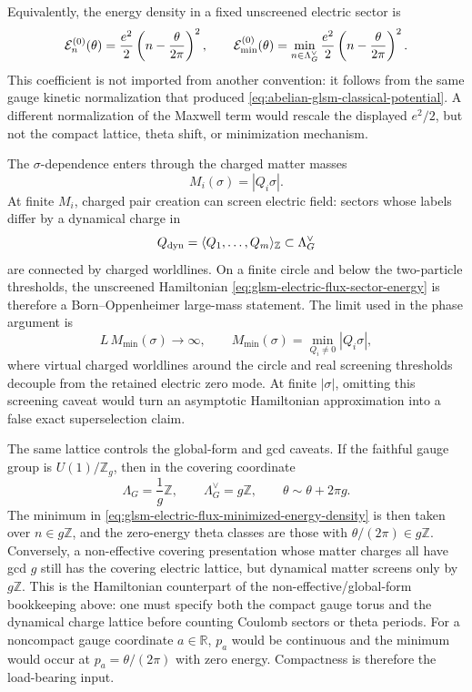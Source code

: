 Equivalently, the energy density in a fixed unscreened electric sector is
\begin{equation}
  \mathcal E^{(0)}_n(\theta)
  =
  \frac{e^2}{2}
  \left(n-\frac{\theta}{2\pi}\right)^2,
  \qquad
  \mathcal E^{(0)}_{\rm min}(\theta)
  =
  \min_{n\in\Lambda_G^\vee}
  \frac{e^2}{2}
  \left(n-\frac{\theta}{2\pi}\right)^2 .
  \label{eq:glsm-electric-flux-minimized-energy-density}
\end{equation}
This coefficient is not imported from another convention: it follows from the
same gauge kinetic normalization that produced
\eqref{eq:abelian-glsm-classical-potential}.  A different normalization of
the Maxwell term would rescale the displayed \(e^2/2\), but not the compact
lattice, theta shift, or minimization mechanism.

The \(\sigma\)-dependence enters through the charged matter masses
\[
  M_i(\sigma)=|Q_i\sigma|.
\]
At finite \(M_i\), charged pair creation can screen electric field: sectors
whose labels differ by a dynamical charge in
\[
  Q_{\rm dyn}=\langle Q_1,\ldots,Q_m\rangle_{\mathbb Z}
  \subset \Lambda_G^\vee
\]
are connected by charged worldlines.  On a finite circle and below the
two-particle thresholds, the unscreened Hamiltonian
\eqref{eq:glsm-electric-flux-sector-energy} is therefore a Born--Oppenheimer
large-mass statement.  The limit used in the phase argument is
\begin{equation}
  L\,M_{\min}(\sigma)\longrightarrow\infty,
  \qquad
  M_{\min}(\sigma)=\min_{Q_i\neq0}|Q_i\sigma|,
  \label{eq:glsm-electric-flux-unscreened-limit}
\end{equation}
where virtual charged worldlines around the circle and real screening
thresholds decouple from the retained electric zero mode.  At finite
\(|\sigma|\), omitting this screening caveat would turn an asymptotic
Hamiltonian approximation into a false exact superselection claim.

The same lattice controls the global-form and gcd caveats.  If the faithful
gauge group is \(U(1)/\mathbb Z_g\), then in the covering coordinate
\[
  \Lambda_G=\frac1g\mathbb Z,\qquad
  \Lambda_G^\vee=g\mathbb Z,\qquad
  \theta\sim\theta+2\pi g .
\]
The minimum in
\eqref{eq:glsm-electric-flux-minimized-energy-density} is then taken over
\(n\in g\mathbb Z\), and the zero-energy theta classes are those with
\(\theta/(2\pi)\in g\mathbb Z\).  Conversely, a non-effective covering
presentation whose matter charges all have gcd \(g\) still has the covering
electric lattice, but dynamical matter screens only by \(g\mathbb Z\).  This
is the Hamiltonian counterpart of the non-effective/global-form bookkeeping
above: one must specify both the compact gauge torus and the dynamical charge
lattice before counting Coulomb sectors or theta periods.  For a noncompact
gauge coordinate \(a\in\mathbb R\), \(p_a\) would be continuous and the
minimum would occur at \(p_a=\theta/(2\pi)\) with zero energy.  Compactness is
therefore the load-bearing input.


